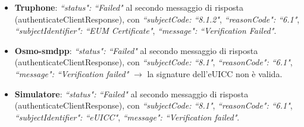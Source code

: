 \documentclass[10pt, oneside]{book}
\begin{document}
\begin{itemize}
\item \textbf{Truphone}: \textit{``status": ``Failed"} al secondo messaggio di risposta (authenticateClientResponse), con \textit{``subjectCode: ``8.1.2"}, \textit{``reasonCode": ``6.1"}, \textit{``subjectIdentifier": ``EUM Certificate"}, \textit{``message": ``Verification Failed"}.
\item \textbf{Osmo-smdpp}: \textit{``status": ``Failed"} al secondo messaggio di risposta (authenticateClientResponse), con \textit{``subjectCode: ``8.1"}, \textit{``reasonCode": ``6.1"}, \textit{``message": ``Verification failed"} $\rightarrow$ la signature dell'eUICC non è valida.
\item \textbf{Simulatore}: \textit{``status": ``Failed"} al secondo messaggio di risposta (authenticateClientResponse), con \textit{``subjectCode: ``8.1"}, \textit{``reasonCode": ``6.1"}, \textit{``subjectIdentifier": ``eUICC"}, \textit{``message": ``Verification failed"}.
\end{itemize}
\end{document}
